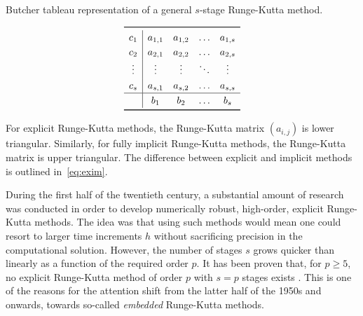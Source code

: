 \clearpage

\begin{table}[htpb]
    \centering
    \caption[Butcher tableau representation of a general $s$-stage
                Runge-Kutta method]{Butcher tableau representation of a general
                    $s$-stage Runge-Kutta method.}
    \label{tab:generalbutcher}
    \[\renewcommand{\arraystretch}{1.25}
        \begin{array}{c|cccc}
            \toprule
            c_{1} & a_{1,1} & a_{1,2} & \ldots & a_{1,s}\\
            c_{2} & a_{2,1} & a_{2,2} & \ldots & a_{2,s}\\
            \vdots & \vdots & \vdots & \ddots & \vdots \\
            c_{s} & a_{s,1} & a_{s,2} & \ldots & a_{s,s}\\
            \hline
            & b_{1} & b_{2} & \ldots & b_{s}\\
            \bottomrule
    \end{array}
\]
\end{table}

For explicit Runge-Kutta methods, the Runge-Kutta matrix $(a_{i,j})$ is lower
triangular. Similarly, for fully implicit Runge-Kutta methods, the Runge-Kutta
matrix is upper triangular. The difference between explicit and implicit
methods is outlined in~\cref{eq:exim}.
%

During the first half of the twentieth century, a substantial amount of research
was conducted in order to develop numerically robust, high-order, explicit
Runge-Kutta methods. The idea was that using such methods would mean one could
resort to larger time increments $h$ without sacrificing precision in the
computational solution. However, the number of stages $s$ grows quicker than
linearly as a function of the required order $p$. It has been proven
that, for $p\geq5$, no explicit Runge-Kutta method of order $p$ with $s=p$
stages exists \parencite[p.173]{hairer1993solving}. This is
one of the reasons for the attention shift from the latter half of the 1950s
and onwards, towards so-called \emph{embedded} Runge-Kutta methods.

